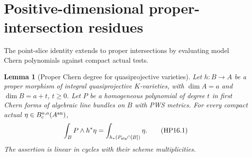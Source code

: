 \documentclass[11pt,a4paper]{article}
\newtheorem{lemma}[theorem]{Lemma}
\theoremstyle{definition}
\theoremstyle{remark}
\numberwithin{equation}{section}
\begin{document}
\section{Positive-dimensional proper-intersection residues}
\label{r16hp:section}

The point-slice identity extends to proper intersections by evaluating model Chern polynomials against compact actual tests.

\begin{lemma}[Proper Chern degree for quasiprojective varieties]
\label{r16hp:degree}
Let $h:B\to A$ be a proper morphism of integral quasiprojective
$K$-varieties, with $\dim A=a$ and $\dim B=a+t$, $t\geq0$. Let $P$
be a homogeneous polynomial of degree $t$ in first Chern forms of
algebraic line bundles on $B$ with PWS metrics. For every compact actual
$\eta\in B_c^{a,a}(A^{\rm an})$,
\[
 \int_B P\wedge h^*\eta
      =\int_{h_*(P_{\rm alg}\cap[B])}\eta.
 \tag{HP16.1}\label{r16hp:degree-eq}
\]
The assertion is linear in cycles with their scheme multiplicities.
\end{lemma}
\end{document}
